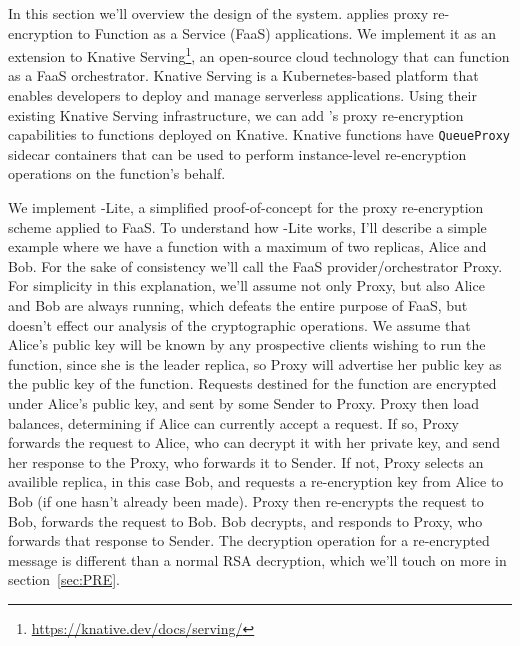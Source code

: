 
In this section we'll overview the design of the \SystemName system.
\SystemName applies proxy re-encryption to Function as a Service (FaaS) applications.
%
We implement it as an extension to Knative Serving\footnote{\url{https://knative.dev/docs/serving/}}, an open-source cloud technology that can function as a FaaS orchestrator.
%
Knative Serving is a Kubernetes-based platform that enables developers to deploy and manage serverless applications.
%
Using their existing Knative Serving infrastructure, we can add \SystemName's proxy re-encryption capabilities to functions deployed on Knative.
%
Knative functions have \texttt{QueueProxy} sidecar containers that can be used to perform instance-level re-encryption operations on the function's behalf.



We implement \SystemName-Lite, a simplified proof-of-concept for the proxy re-encryption scheme applied to FaaS.
%
To understand how \SystemName-Lite works, I'll describe a simple example where we have a function with a maximum of two replicas, Alice and Bob.
For the sake of consistency we'll call the FaaS provider/orchestrator Proxy.
For simplicity in this explanation, we'll assume not only Proxy, but also Alice and Bob are always running, which defeats the entire purpose of FaaS, but doesn't effect our analysis of the cryptographic operations.
We assume that Alice's public key will be known by any prospective clients wishing to run the function, since she is the leader replica, so Proxy will advertise her public key as the public key of the function.
Requests destined for the function are encrypted under Alice's public key, and sent by some Sender to Proxy.
Proxy then load balances, determining if Alice can currently accept a request.
If so, Proxy forwards the request to Alice, who can decrypt it with her private key, and send her response to the Proxy, who forwards it to Sender.
If not, Proxy selects an availible replica, in this case Bob, and requests a re-encryption key from Alice to Bob (if one hasn't already been made).
Proxy then re-encrypts the request to Bob, forwards the request to Bob.
Bob decrypts, and responds to Proxy, who forwards that response to Sender.
The decryption operation for a re-encrypted message is different than a normal RSA decryption, which we'll touch on more in section~\ref{sec:PRE}.


